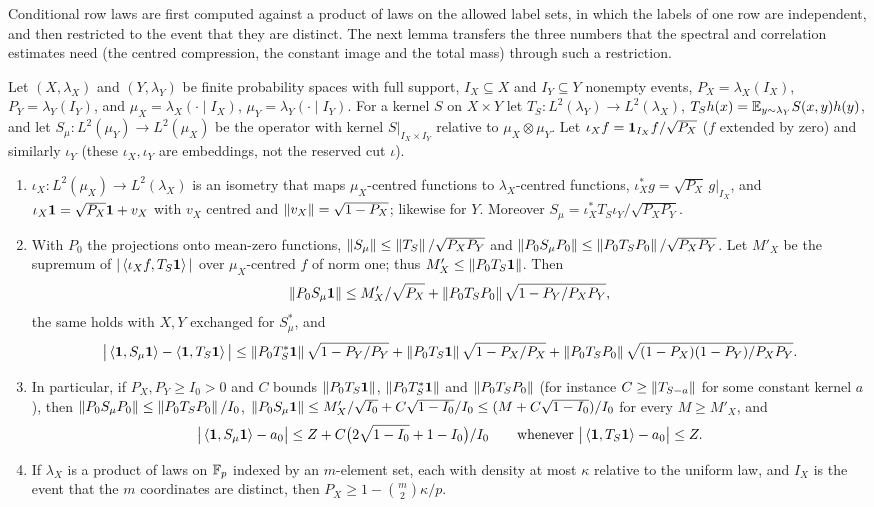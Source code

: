 Conditional row laws are first computed against a product of laws on the allowed label sets,
in which the labels of one row are independent, and then restricted to the
event that they are distinct. The next lemma transfers the three numbers that
the spectral and correlation estimates need (the centred compression, the
constant image and the total mass) through such a restriction.

\begin{lemma}\label{lem:restriction}
Let $(X,\lambda_X)$ and $(Y,\lambda_Y)$ be finite probability spaces with full
support, $I_X\subseteq X$ and $I_Y\subseteq Y$ nonempty events,
$P_X=\lambda_X(I_X)$, $P_Y=\lambda_Y(I_Y)$, and $\mu_X=\lambda_X(\cdot\mid
I_X)$, $\mu_Y=\lambda_Y(\cdot\mid I_Y)$. For a kernel $S$ on $X\times Y$ let
$T_S\colon L^2(\lambda_Y)\to L^2(\lambda_X)$, $T_Sh(x)=\mathbb E_{y\sim\lambda_Y}S(x,y)h(y)$,
and let $S_\mu\colon L^2(\mu_Y)\to L^2(\mu_X)$ be the operator with kernel
$S|_{I_X\times I_Y}$ relative to $\mu_X\otimes\mu_Y$. Let
$\iota_Xf=\mathbf 1_{I_X}f/\sqrt{P_X}$ ($f$ extended by zero) and
similarly $\iota_Y$ (these $\iota_X,\iota_Y$ are embeddings, not
the reserved cut $\iota$).
\begin{enumerate}[label=\textup{(\alph*)}]
\item $\iota_X\colon L^2(\mu_X)\to L^2(\lambda_X)$ is an isometry that maps
  $\mu_X$-centred functions to $\lambda_X$-centred functions,
  $\iota_X^*g=\sqrt{P_X}\,g|_{I_X}$, and $\iota_X\mathbf 1=\sqrt{P_X}\mathbf 1+v_X$ with
  $v_X$ centred and $\left\|v_X\right\|=\sqrt{1-P_X}$; likewise for $Y$. Moreover
  $S_\mu=\iota_X^*T_S\iota_Y/\sqrt{P_XP_Y}$.
\item With $P_0$ the projections onto mean-zero functions,
  $\left\|S_\mu\right\|\le\left\|T_S\right\|/\sqrt{P_XP_Y}$ and
  $\left\|P_0S_\mu P_0\right\|\le\left\|P_0T_SP_0\right\|/\sqrt{P_XP_Y}$. Let $M'_X$ be the
  supremum of $|\left\langle \iota_Xf,T_S\mathbf 1\right\rangle|$ over $\mu_X$-centred $f$ of norm one;
  thus $M'_X\le\left\|P_0T_S\mathbf 1\right\|$. Then
  \[
    \left\|P_0S_\mu\mathbf 1\right\|\le M'_X/\sqrt{P_X}+\left\|P_0T_SP_0\right\|
    \sqrt{1-P_Y/P_XP_Y},
  \]
  the same holds with $X,Y$ exchanged for $S_\mu^*$, and
  \[
    \big|\left\langle \mathbf 1,S_\mu\mathbf 1\right\rangle-\left\langle \mathbf 1,T_S\mathbf 1\right\rangle\big|\le\left\|P_0T_S^*\mathbf 1\right\|
    \sqrt{1-P_Y/P_Y}+\left\|P_0T_S\mathbf 1\right\|\sqrt{1-P_X/P_X}
    +\left\|P_0T_SP_0\right\|\sqrt{(1-P_X)(1-P_Y)/P_XP_Y} .
  \]
\item In particular, if $P_X,P_Y\ge I_0>0$ and $C$ bounds
  $\left\|P_0T_S\mathbf 1\right\|$, $\left\|P_0T_S^*\mathbf 1\right\|$ and $\left\|P_0T_SP_0\right\|$ (for
  instance $C\ge\left\|T_{S-a}\right\|$ for some constant kernel $a$), then
  $\left\|P_0S_\mu P_0\right\|\le\left\|P_0T_SP_0\right\|/I_0$,
  $\left\|P_0S_\mu\mathbf 1\right\|\le M'_X/\sqrt{I_0}+C\sqrt{1-I_0}/I_0\le(M+C\sqrt{1-I_0})/I_0$
  for every $M\ge M'_X$, and
  \[
    \big|\left\langle \mathbf 1,S_\mu\mathbf 1\right\rangle-a_0\big|\le Z+C\big(2\sqrt{1-I_0}+1-I_0\big)/I_0
    \qquad\text{whenever }\big|\left\langle \mathbf 1,T_S\mathbf 1\right\rangle-a_0\big|\le Z .
  \]
\item If $\lambda_X$ is a product of laws on $\mathbb F_p$ indexed by an $m$-element
  set, each with density at most $\kappa$ relative to the uniform law, and
  $I_X$ is the event that the $m$ coordinates are distinct, then
  $P_X\ge1-\binom m2\kappa/p$.
\end{enumerate}
\end{lemma}

